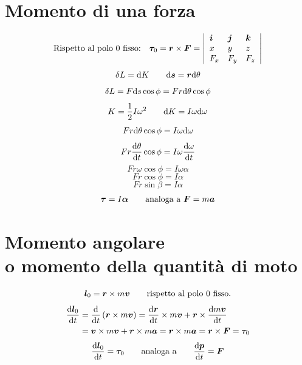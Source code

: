 \section{Momento di una forza}
$$\text{Rispetto al polo $0$ fisso:}\quad\boldsymbol{\tau}_0=\boldsymbol{r} \times \boldsymbol{F}=\left |
\begin{array}{lll}
\boldsymbol{i} & \boldsymbol{j} & \boldsymbol{k}\\
x & y & z\\
F_x & F_y &F_z\\
\end{array}
\right|$$
\begin{equation*}\delta L=\mathrm{d} K\qquad \mathrm{d} \boldsymbol{s}=\boldsymbol{r}\mathrm{d} \theta\end{equation*}
\begin{equation*}\delta L=F\mathrm{d} s\cos \phi=Fr\mathrm{d}\theta\cos\phi\end{equation*}
\begin{equation*}K=\frac{1}{2}I\omega^2\qquad\mathrm{d} K=I\omega\mathrm{d}\omega\end{equation*}
\begin{equation*}Fr\mathrm{d}\theta\cos\phi=I\omega\mathrm{d}\omega\end{equation*}
$$Fr\frac{\mathrm{d}\theta}{\mathrm{d} t}\cos\phi=I\omega\frac{\mathrm{d}\omega}{\mathrm{d}
t}$$
\begin{equation*}Fr\omega\cos\phi=I\omega\alpha\end{equation*}
\begin{equation*}Fr\cos\phi=I\alpha\end{equation*}
\begin{equation*}Fr\sin\beta=I\alpha\end{equation*}
\begin{equation*}\boldsymbol{\tau}=I\boldsymbol{\alpha}\qquad\text{analoga a $\boldsymbol{F}=m\boldsymbol{a}$}\end{equation*}
\section[\index{momento!angolare}\index{momento!della quantità di moto}Momento angolare o della quantità di moto]{Momento angolare\\ o momento della quantità di moto}
\begin{equation*}\boldsymbol{l}_0=\boldsymbol{r}\times m\boldsymbol{v}\qquad\text{rispetto al polo $0$ fisso.}\end{equation*}
\begin{align*}
\frac{\mathrm{d} \boldsymbol{l}_0}{\mathrm{d} t}&=\frac{\mathrm{d}}{\mathrm{d} t}\left(\boldsymbol{r}\times m\boldsymbol{v}\right)= \frac{\mathrm{d}\boldsymbol{r}}{\mathrm{d} t}\times m\boldsymbol{v}+\boldsymbol{r}\times\frac{\mathrm{d} m\boldsymbol{v}}{\mathrm{d} t}\\
&=\boldsymbol{v}\times m\boldsymbol{v}+\boldsymbol{r} \times m\boldsymbol{a}=\boldsymbol{r}\times m\boldsymbol{a}=\boldsymbol{r}\times\boldsymbol{F}=\boldsymbol{\tau}_0
\end{align*}
$$\frac{\mathrm{d}\boldsymbol{l}_0}{\mathrm{d} t}=\boldsymbol{\tau}_0\qquad\text{analoga
a}\qquad\frac{\mathrm{d} \boldsymbol{p}}{\mathrm{d} t}=\boldsymbol{F}$$
